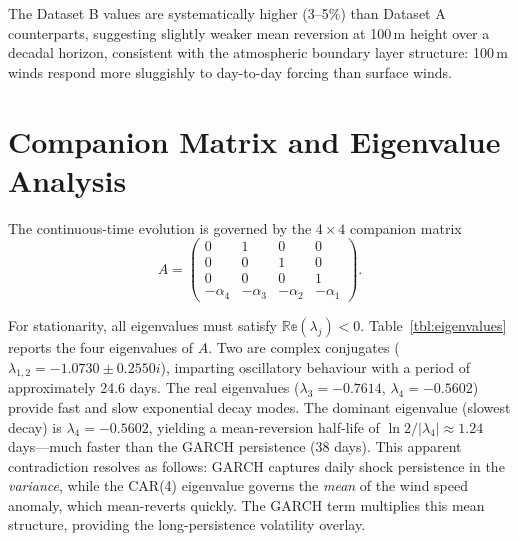 \documentclass[11pt, a4paper, twoside]{article}
\begin{document}
The Dataset B values are systematically higher (3--5\%) than Dataset A counterparts, suggesting slightly weaker mean reversion at 100\,m height over a decadal horizon, consistent with the atmospheric boundary layer structure: 100\,m winds respond more sluggishly to day-to-day forcing than surface winds.

\section{Companion Matrix and Eigenvalue Analysis}

The continuous-time evolution is governed by the $4 \times 4$ companion matrix
\begin{equation}
A = \begin{pmatrix}
0 & 1 & 0 & 0 \\
0 & 0 & 1 & 0 \\
0 & 0 & 0 & 1 \\
-\alpha_4 & -\alpha_3 & -\alpha_2 & -\alpha_1
\end{pmatrix}.
\end{equation}

For stationarity, all eigenvalues must satisfy $\mathbb{Re}(\lambda_j) < 0$. Table~\ref{tbl:eigenvalues} reports the four eigenvalues of $A$. Two are complex conjugates ($\lambda_{1,2} = -1.0730 \pm 0.2550i$), imparting oscillatory behaviour with a period of approximately 24.6 days. The real eigenvalues ($\lambda_3 = -0.7614$, $\lambda_4 = -0.5602$) provide fast and slow exponential decay modes. The dominant eigenvalue (slowest decay) is $\lambda_4 = -0.5602$, yielding a mean-reversion half-life of $\ln 2 / |\lambda_4| \approx 1.24$ days---much faster than the GARCH persistence (38 days). This apparent contradiction resolves as follows: GARCH captures daily shock persistence in the \textit{variance}, while the CAR(4) eigenvalue governs the \textit{mean} of the wind speed anomaly, which mean-reverts quickly. The GARCH term multiplies this mean structure, providing the long-persistence volatility overlay.
\end{document}
